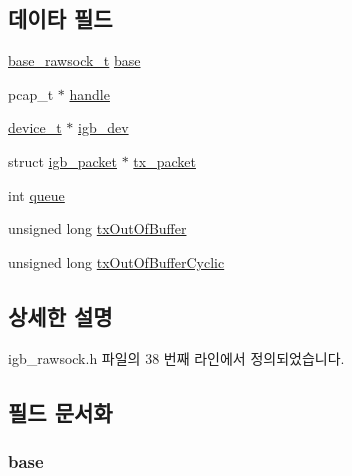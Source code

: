 \subsection*{데이타 필드}
\begin{DoxyCompactItemize}
\item 
\hyperlink{rawsock__impl_8h_ac539cdabcfe438f13001a289f222e6a2}{base\+\_\+rawsock\+\_\+t} \hyperlink{structigb__rawsock__t_a1507c5af4508d59cb0a730a852763e94}{base}
\item 
pcap\+\_\+t $\ast$ \hyperlink{structigb__rawsock__t_a6c138155d7b3442efd19d0aa3f93e548}{handle}
\item 
\hyperlink{lib_2igb_2igb_8h_ae819c345449e1c44d253068a0a3ab5e5}{device\+\_\+t} $\ast$ \hyperlink{structigb__rawsock__t_a7b2a35a4e18e65c05ba807260a72444a}{igb\+\_\+dev}
\item 
struct \hyperlink{structigb__packet}{igb\+\_\+packet} $\ast$ \hyperlink{structigb__rawsock__t_ade50152273d5aaf75ab880336c6333e3}{tx\+\_\+packet}
\item 
int \hyperlink{structigb__rawsock__t_a404442353660d7effc914ba8220ebf7f}{queue}
\item 
unsigned long \hyperlink{structigb__rawsock__t_a93b332533b50c7524d3eb7fc03a8df7a}{tx\+Out\+Of\+Buffer}
\item 
unsigned long \hyperlink{structigb__rawsock__t_ab72f6e390a1b3447a247f4c70c6ff8d0}{tx\+Out\+Of\+Buffer\+Cyclic}
\end{DoxyCompactItemize}


\subsection{상세한 설명}


igb\+\_\+rawsock.\+h 파일의 38 번째 라인에서 정의되었습니다.



\subsection{필드 문서화}
\subsubsection[{\texorpdfstring{base}{base}}]{ base}\hypertarget{structigb__rawsock__t_a1507c5af4508d59cb0a730a852763e94}{}\label{structigb__rawsock__t_a1507c5af4508d59cb0a730a852763e94}



